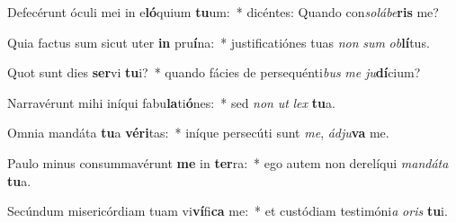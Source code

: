 \item Defecérunt óculi mei in e\textbf{ló}quium \textbf{tu}um:~* dicéntes: Quando con\textit{so}\textit{lá}\textit{be}\textbf{ris} me?
\item Quia factus sum sicut uter \textbf{in} pru\textbf{í}na:~* justificatiónes tuas \textit{non} \textit{sum} \textit{ob}\textbf{lí}tus.
\item Quot sunt dies \textbf{ser}vi \textbf{tu}i?~* quando fácies de persequénti\textit{bus} \textit{me} \textit{ju}\textbf{dí}cium?
\item Narravérunt mihi iníqui fabu\textbf{la}ti\textbf{ó}nes:~* sed \textit{non} \textit{ut} \textit{lex} \textbf{tu}a.
\item Omnia mandáta \textbf{tu}a \textbf{vé}\textbf{ri}tas:~* iníque persecúti sunt \textit{me}, \textit{ád}\textit{ju}\textbf{va} me.
\item Paulo minus consummavérunt \textbf{me} in \textbf{ter}ra:~* ego autem non derelíqui \textit{man}\textit{dá}\textit{ta} \textbf{tu}a.
\item Secúndum misericórdiam tuam vi\textbf{ví}fi\textbf{ca} me:~* et custódiam testimóni\textit{a} \textit{o}\textit{ris} \textbf{tu}i.
